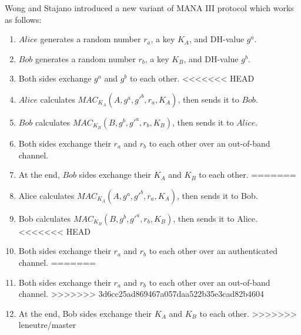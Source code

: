 Wong and Stajano introduced a new variant of MANA III protocol which works as follows:

\begin{enumerate}
\item $Alice$ generates a random number $r_a$, a key $K_A$, and DH-value $g^a$.
\item $Bob$ generates a random number $r_b$, a key $K_B$, and DH-value $g^b$.
\item Both sides exchange $g^a$ and $g^b$ to each other.
<<<<<<< HEAD
\item $Alice$ calculates $MAC_{K_A}(A,g^a,g'^b,r_a,K_A)$, then sends it to $Bob$. 
\item $Bob$ calculates $MAC_{K_B}(B,g^b,g'^a,r_b,K_B)$, then sends it to $Alice$.
\item Both sides exchange their $r_a$ and $r_b$ to each other over an out-of-band channel. 
\item At the end, $Bob$ sides exchange their $K_A$ and $K_B$ to each other. 
=======
\item Alice calculates $MAC_{K_A}(A,g^a,g'^b,r_a,K_A)$, then sends it to Bob. 
\item Bob calculates $MAC_{K_B}(B,g^b,g'^a,r_b,K_B)$, then sends it to Alice.
<<<<<<< HEAD
\item Both sides exchange their $r_a$ and $r_b$ to each other over an authenticated channel. 
=======
\item Both sides exchange their $r_a$ and $r_b$ to each other over an out-of-band channel. 
>>>>>>> 3d6cc25ad869467a057daa522b35e3cad82b4604
\item At the end, Bob sides exchange their $K_A$ and $K_B$ to each other. 
>>>>>>> leneutre/master
\end{enumerate}

